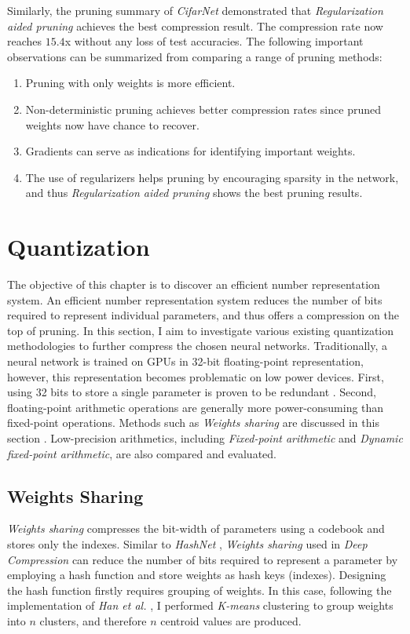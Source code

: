 \documentclass[a4paper,12pt]{report}
\begin{document}
Similarly, the pruning summary of \textit{CifarNet} demonstrated that
\textit{Regularization aided pruning} achieves the best compression result.
The compression rate now reaches $15.4$x without any loss of test accuracies.
The following important observations can be summarized from comparing a range
of pruning methods:
\begin{enumerate}
  \item Pruning with only weights is more efficient.
  \item Non-deterministic pruning achieves better compression rates since pruned weights now have chance to recover.
  \item Gradients can serve as indications for identifying important weights.
  \item The use of regularizers helps pruning by encouraging sparsity in the network,
  and thus \textit{Regularization aided pruning} shows the best pruning results.
\end{enumerate}

\chapter{Quantization}
The objective of this chapter is to discover an efficient number representation
system.
An efficient number representation system reduces the number of bits
required to represent individual parameters, and thus offers a compression
on the top of pruning.
In this section, I aim to investigate various existing quantization methodologies to further
compress the chosen neural networks.
Traditionally, a neural network is trained on GPUs in 32-bit floating-point
representation, however, this representation becomes problematic on low power devices.
First, using 32 bits to store a single parameter is proven to be redundant
\cite{mellempudi2017mixed}.
Second, floating-point arithmetic operations are generally more power-consuming than
fixed-point operations.
Methods such as \textit{Weights sharing} are discussed in this section
\cite{Han15}.
Low-precision arithmetics, including \textit{Fixed-point arithmetic} and \textit{Dynamic fixed-point
arithmetic}, are also compared and evaluated.

\section{Weights Sharing}
\textit{Weights sharing} compresses the bit-width of parameters using a codebook and stores only
the indexes.
Similar to \textit{HashNet} \cite{chen2015compressing}, \textit{Weights sharing} used in \textit{Deep Compression}
\cite{Han15} can reduce the number of bits required
to represent a parameter by employing a hash function and store weights as hash keys (indexes).
Designing the hash function firstly requires grouping of weights.
In this case, following the implementation of \textit{Han et al.} \cite{Han15},
I performed \textit{K-means} clustering \cite{kanungo2002efficient}
to group weights into $n$ clusters, and therefore $n$ centroid values are produced.
\end{document}
